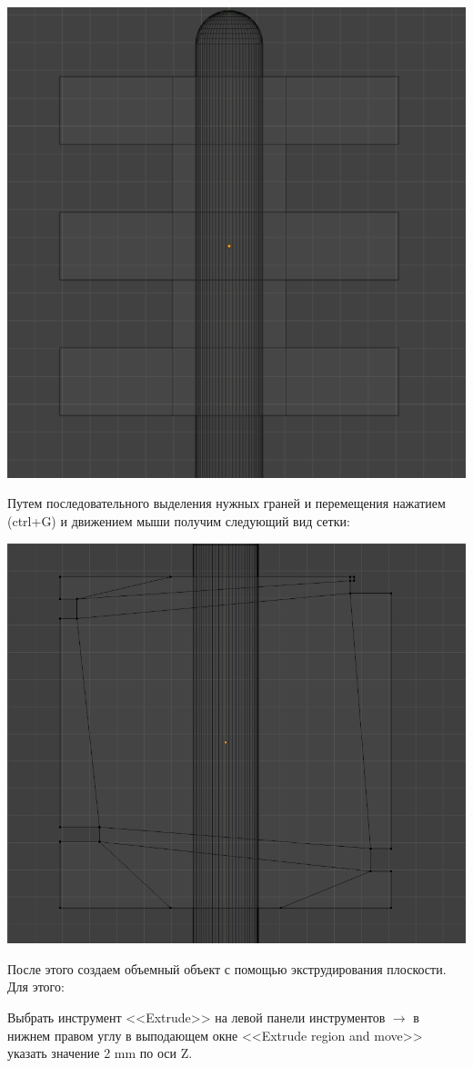 \documentclass[12pt]{article}
\begin{document}
\begin{enumerate}
\vskip 1cm
{
    \centering
    \includegraphics[width=0.8\linewidth]{3сетка2.png}
    \label{fig:i1}
}
\vskip 1cm

Путем последовательного выделения нужных граней и перемещения нажатием (ctrl+G) и движением мыши получим следующий вид сетки:


\vskip 1cm
{
    \centering
    \includegraphics[width=0.8\linewidth]{3сет3.png}
    \label{fig:i1}
}
\vskip 1cm

После этого создаем объемный объект с помощью 
экструдирования плоскости. Для этого:


 Выбрать инструмент <<Extrude>> на левой панели инструментов  $\to $ в нижнем правом углу в выподающем окне <<Extrude region and move>> указать значение 2 mm по оси Z.
 




\end{enumerate}
\end{document}
